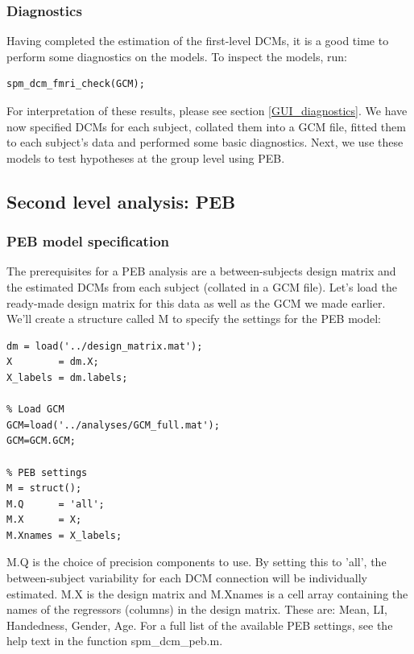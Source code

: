 \documentclass{article}
\begin{document}
\subsubsection{Diagnostics}
Having completed the estimation of the first-level DCMs, it is a good time to perform some diagnostics on the models. To inspect the models, run:

\begin{lstlisting}[style=Matlab-editor, caption=DCM for fMRI diagnostics]
spm_dcm_fmri_check(GCM);
\end{lstlisting}

For interpretation of these results, please see section \ref{GUI_diagnostics}. We have now specified DCMs for each subject, collated them into a GCM file, fitted them to each subject's data and performed some basic diagnostics. Next, we use these models to test hypotheses at the group level using PEB.

\subsection{Second level analysis: PEB}

\subsubsection{PEB model specification}
The prerequisites for a PEB analysis are a between-subjects design matrix and the estimated DCMs from each subject (collated in a GCM file). Let's load the ready-made design matrix for this data as well as the GCM we made earlier. We'll create a structure called M to specify the settings for the PEB model:

\begin{lstlisting}[style=Matlab-editor,caption=PEB specification]
% Load design matrix
dm = load('../design_matrix.mat');
X        = dm.X;
X_labels = dm.labels;

% Load GCM
GCM=load('../analyses/GCM_full.mat');
GCM=GCM.GCM;

% PEB settings
M = struct();
M.Q      = 'all';
M.X      = X;
M.Xnames = X_labels;
\end{lstlisting}

M.Q is the choice of precision components to use. By setting this to 'all', the between-subject variability for each DCM connection will be individually estimated. M.X is the design matrix and M.Xnames is a cell array containing the names of the regressors (columns) in the design matrix. These are: Mean, LI, Handedness, Gender, Age. For a full list of the available PEB settings, see the help text in the function spm\_dcm\_peb.m. 
\end{document}
